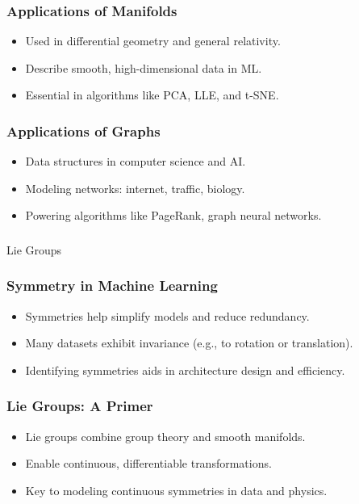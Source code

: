 \begin{frame}[fragile]\frametitle{Applications of Manifolds}
    \begin{itemize}
        \item Used in differential geometry and general relativity.
        \item Describe smooth, high-dimensional data in ML.
        \item Essential in algorithms like PCA, LLE, and t-SNE.
    \end{itemize}
\end{frame}

\begin{frame}[fragile]\frametitle{Applications of Graphs}
    \begin{itemize}
        \item Data structures in computer science and AI.
        \item Modeling networks: internet, traffic, biology.
        \item Powering algorithms like PageRank, graph neural networks.
    \end{itemize}
\end{frame}


\begin{frame}[fragile]\frametitle{}
\begin{center}
{\Large Lie Groups}
\end{center}
\end{frame}

\begin{frame}[fragile]\frametitle{Symmetry in Machine Learning}
  \begin{itemize}
    \item Symmetries help simplify models and reduce redundancy.
    \item Many datasets exhibit invariance (e.g., to rotation or translation).
    \item Identifying symmetries aids in architecture design and efficiency.
  \end{itemize}
\end{frame}

\begin{frame}[fragile]\frametitle{Lie Groups: A Primer}
  \begin{itemize}
    \item Lie groups combine group theory and smooth manifolds.
    \item Enable continuous, differentiable transformations.
    \item Key to modeling continuous symmetries in data and physics.
  \end{itemize}
\end{frame}

